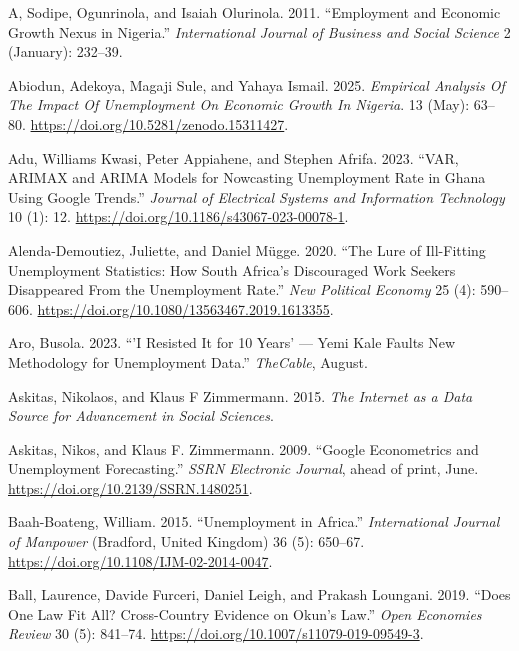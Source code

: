 \documentclass[
  letterpaper,
  DIV=11,
  numbers=noendperiod]{scrartcl}
\newlength{\cslhangindent}
\newenvironment{CSLReferences}[2] %
 {\begin{list}{}{%
  \setlength{\itemindent}{0pt}
  \setlength{\leftmargin}{0pt}
  \setlength{\parsep}{0pt}
  \ifodd #1
   \setlength{\leftmargin}{\cslhangindent}
   \setlength{\itemindent}{-1\cslhangindent}
  \fi
  \setlength{\itemsep}{#2\baselineskip}}}
 {\end{list}}
\begin{document}
\protect{}\label{refs}
\begin{CSLReferences}{1}{1}
A, Sodipe, Ogunrinola, and Isaiah Olurinola. 2011. {``Employment and
{Economic Growth Nexus} in {Nigeria}.''} \emph{International Journal of
Business and Social Science} 2 (January): 232--39.

Abiodun, Adekoya, Magaji Sule, and Yahaya Ismail. 2025. \emph{Empirical
{Analysis Of The Impact Of Unemployment On Economic Growth In Nigeria}}.
13 (May): 63--80. \url{https://doi.org/10.5281/zenodo.15311427}.

Adu, Williams Kwasi, Peter Appiahene, and Stephen Afrifa. 2023.
{``{VAR}, {ARIMAX} and {ARIMA} Models for Nowcasting Unemployment Rate
in {Ghana} Using {Google} Trends.''} \emph{Journal of Electrical Systems
and Information Technology} 10 (1): 12.
\url{https://doi.org/10.1186/s43067-023-00078-1}.

Alenda-Demoutiez, Juliette, and Daniel Mügge. 2020. {``The {Lure} of
{Ill-Fitting Unemployment Statistics}: {How South Africa}'s {Discouraged
Work Seekers Disappeared From} the {Unemployment Rate}.''} \emph{New
Political Economy} 25 (4): 590--606.
\url{https://doi.org/10.1080/13563467.2019.1613355}.

Aro, Busola. 2023. {``'{I} Resisted It for 10 Years' --- {Yemi Kale}
Faults New Methodology for Unemployment Data.''} \emph{TheCable},
August.

Askitas, Nikolaos, and Klaus F Zimmermann. 2015. \emph{The {Internet} as
a {Data Source} for {Advancement} in {Social Sciences}}.

Askitas, Nikos, and Klaus F. Zimmermann. 2009. {``Google {Econometrics}
and {Unemployment Forecasting}.''} \emph{SSRN Electronic Journal}, ahead
of print, June. \url{https://doi.org/10.2139/SSRN.1480251}.

Baah-Boateng, William. 2015. {``Unemployment in {Africa}.''}
\emph{International Journal of Manpower} (Bradford, United Kingdom) 36
(5): 650--67. \url{https://doi.org/10.1108/IJM-02-2014-0047}.

Ball, Laurence, Davide Furceri, Daniel Leigh, and Prakash Loungani.
2019. {``Does {One Law Fit All}? {Cross-Country Evidence} on {Okun}'s
{Law}.''} \emph{Open Economies Review} 30 (5): 841--74.
\url{https://doi.org/10.1007/s11079-019-09549-3}.


\end{CSLReferences}
\end{document}
